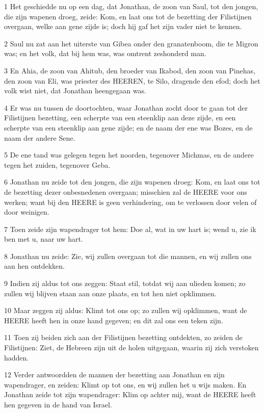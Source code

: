 \par 1 Het geschiedde nu op een dag, dat Jonathan, de zoon van Saul, tot den jongen, die zijn wapenen droeg, zeide: Kom, en laat ons tot de bezetting der Filistijnen overgaan, welke aan gene zijde is; doch hij gaf het zijn vader niet te kennen.
\par 2 Saul nu zat aan het uiterste van Gibea onder den granatenboom, die te Migron was; en het volk, dat bij hem was, was omtrent zeshonderd man.
\par 3 En Ahia, de zoon van Ahitub, den broeder van Ikabod, den zoon van Pinehas, den zoon van Eli, was priester des HEEREN, te Silo, dragende den efod; doch het volk wist niet, dat Jonathan heengegaan was.
\par 4 Er was nu tussen de doortochten, waar Jonathan zocht door te gaan tot der Filistijnen bezetting, een scherpte van een steenklip aan deze zijde, en een scherpte van een steenklip aan gene zijde; en de naam der ene was Bozes, en de naam der andere Sene.
\par 5 De ene tand was gelegen tegen het noorden, tegenover Michmas, en de andere tegen het zuiden, tegenover Geba.
\par 6 Jonathan nu zeide tot den jongen, die zijn wapenen droeg: Kom, en laat ons tot de bezetting dezer onbesnedenen overgaan; misschien zal de HEERE voor ons werken; want bij den HEERE is geen verhindering, om te verlossen door velen of door weinigen.
\par 7 Toen zeide zijn wapendrager tot hem: Doe al, wat in uw hart is; wend u, zie ik ben met u, naar uw hart.
\par 8 Jonathan nu zeide: Zie, wij zullen overgaan tot die mannen, en wij zullen ons aan hen ontdekken.
\par 9 Indien zij aldus tot ons zeggen: Staat stil, totdat wij aan ulieden komen; zo zullen wij blijven staan aan onze plaats, en tot hen niet opklimmen.
\par 10 Maar zeggen zij aldus: Klimt tot ons op; zo zullen wij opklimmen, want de HEERE heeft hen in onze hand gegeven; en dit zal ons een teken zijn.
\par 11 Toen zij beiden zich aan der Filistijnen bezetting ontdekten, zo zeiden de Filistijnen: Ziet, de Hebreen zijn uit de holen uitgegaan, waarin zij zich verstoken hadden.
\par 12 Verder antwoordden de mannen der bezetting aan Jonathan en zijn wapendrager, en zeiden: Klimt op tot ons, en wij zullen het u wijs maken. En Jonathan zeide tot zijn wapendrager: Klim op achter mij, want de HEERE heeft hen gegeven in de hand van Israel.
